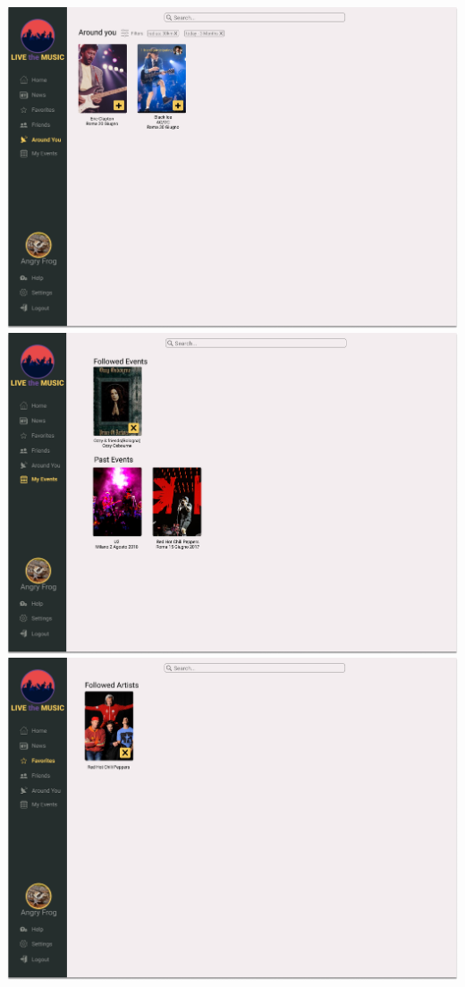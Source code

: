 \documentclass[11pt,a4paper]{article}
\begin{document}
\begin{itemize}
\includegraphics[scale=0.25]{AroundYou.jpg}
\includegraphics[scale=0.25]{MyEvents.jpg}
\includegraphics[scale=0.25]{Favorites.jpg}

\end{itemize}
\end{document}
